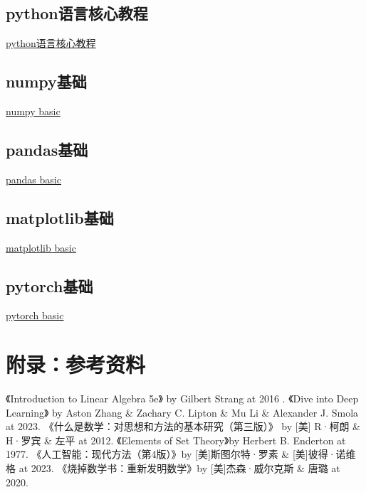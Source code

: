 \documentclass[12pt,oneside]{book}
\begin{document}
\chapter{python语言核心教程}
\href{https://a358003542.github.io/articles/python-core-tutorial.html}{python语言核心教程}



\chapter{numpy基础}
\href{https://github.com/a358003542/ipynb_notebook/blob/master/linear_algebra/numpy_basic.ipynb}{numpy basic}


\chapter{pandas基础}
\href{https://github.com/a358003542/ipynb_notebook/blob/master/linear_algebra/pandas_basic.ipynb}{pandas basic}

\chapter{matplotlib基础}
\href{https://github.com/a358003542/ipynb_notebook/blob/master/matplotlib_basic.ipynb}{matplotlib basic}

\chapter{pytorch基础}
\href{https://github.com/a358003542/ipynb_notebook/blob/master/neural_network/pytorch_basic.ipynb}{pytorch basic}

\backmatter
\part*{附录：参考资料}
\begin{thebibliography}{99}
 《Introduction to Linear Algebra 5e》 by Gilbert Strang at 2016 .
 《Dive into Deep Learning》 by Aston Zhang \& Zachary C. Lipton \& Mu Li \& Alexander J. Smola at 2023.
 《什么是数学：对思想和方法的基本研究（第三版）》 by [美] R·柯朗 \& H·罗宾 \&  左平  at 2012.
 《Elements of Set Theory》by Herbert B. Enderton at 1977.
 《人工智能：现代方法（第4版）》by [美]斯图尔特·罗素 \& [美]彼得·诺维格 at 2023.
 《烧掉数学书：重新发明数学》by [美]杰森·威尔克斯 \& 唐璐 at 2020.
\end{thebibliography}
\end{document}

